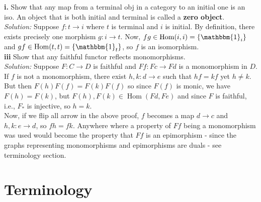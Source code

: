 \documentclass[a4paper]{article}
\theoremstyle{plain}%
\theoremstyle{definition}
\theoremstyle{remark}
\DeclareMathOperator{\Hom}{Hom}
\begin{document}
\textbf{i.} Show that any map from a terminal obj in a category to an initial
one is an iso. An object that is both initial and terminal is called
a \textbf{zero object}.\\
\linebreak
\textit{Solution:}
Suppose $f  \colon t \to i$ where $t$ is terminal and $i$ is initial. By
definition, there exists precisely one morphism
$g  \colon i \to t$. Now, $fg \in \Hom (i,i) =
\left\{ \mathbbm{1}_i \right\} $ and
$gf \in \Hom(t,t) = \left\{ \mathbbm{1}_t \right\} $, so
$f$ is an isomorphism.\\
\linebreak
\textbf{iii} Show that any faithful functor reflects monomorphisms.\\
\linebreak
\textit{Solution:} Suppose $F  \colon C \to D$ is faithful and
$F f  \colon Fc \to Fd$ is a monomorphism in $D$. If $f$ is not a monomorphism,
there exist $h,k  \colon d \to e$ such that
$hf = kf$ yet $h \neq k$. But then
$F(h) F(f) = F(k) F(f)$ so since $F(f)$ is monic, we have
$F(h) = F(k)$, but $F(h), F(k) \in \Hom(Fd, Fe)$ and since
$F$ is faithful, i.e., $F_*$ is injective, so $h = k$.\\
\linebreak
Now, if we flip all arrow in the above proof, $f$ becomes a map
$d \to c$ and $h,k  \colon e \to d$, so $fh = fk$. 
Anywhere where a property of $F f$ being a monomorphism was used would become
the property that $Ff$ is an epimorphism - since the graphs representing
monomorphisms and epimorphisms are duals - see terminology section.\\
\linebreak









\section*{Terminology}
\end{document}
